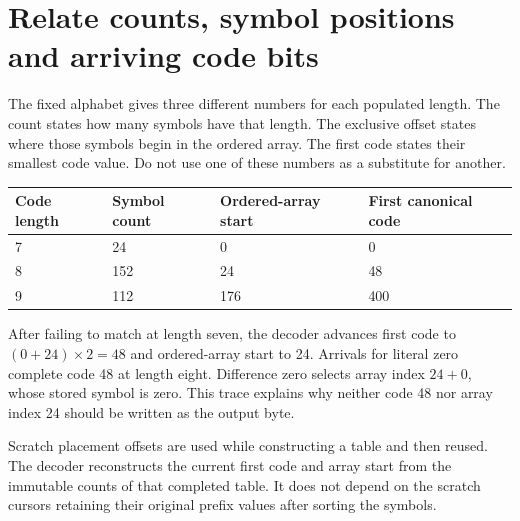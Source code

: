 \section{Relate counts, symbol positions and arriving code bits}
The fixed alphabet gives three different numbers for each populated length. The count
states how many symbols have that length. The exclusive offset states where those
symbols begin in the ordered array. The first code states their smallest code value.
Do not use one of these numbers as a substitute for another.

\begin{longtable}{p{24mm}p{30mm}p{36mm}p{47mm}}
  \toprule Code length & Symbol count & Ordered-array start & First canonical code \\\midrule
  7                    & 24           & 0                   & 0                    \\
  8                    & 152          & 24                  & 48                   \\
  9                    & 112          & 176                 & 400                  \\\bottomrule
\end{longtable}
After failing to match at length seven, the decoder advances first code to
$(0+24)\times2=48$ and ordered-array start to 24. Arrivals for literal zero complete
code 48 at length eight. Difference zero selects array index $24+0$, whose stored
symbol is zero. This trace explains why neither code 48 nor array index 24 should be
written as the output byte.

Scratch placement offsets are used while constructing a table and then reused.
The decoder reconstructs the current first code and array start from the immutable
counts of that completed table. It does not depend on the scratch cursors retaining
their original prefix values after sorting the symbols.
